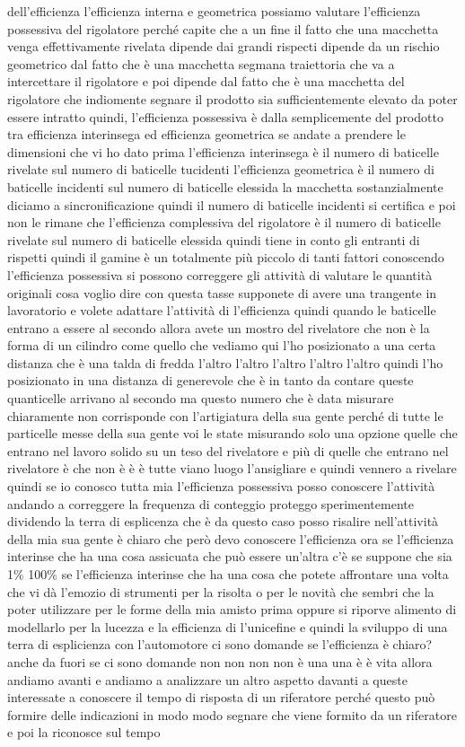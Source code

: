 dell'efficienza l'efficienza interna e geometrica possiamo valutare l'efficienza possessiva del rigolatore perché capite che a un fine il fatto che una macchetta venga effettivamente rivelata dipende dai grandi rispecti dipende da un rischio geometrico dal fatto che è una macchetta segmana traiettoria che va a intercettare il rigolatore e poi dipende dal fatto che è una macchetta del rigolatore che indiomente segnare il prodotto sia sufficientemente elevato da poter essere intratto quindi, l'efficienza possessiva è dalla semplicemente del prodotto tra efficienza interinsega ed efficienza geometrica se andate a prendere le dimensioni che vi ho dato prima l'efficienza interinsega è il numero di baticelle rivelate sul numero di baticelle tucidenti l'efficienza geometrica è il numero di baticelle incidenti sul numero di baticelle elessida la macchetta sostanzialmente diciamo a sincronificazione quindi il numero di baticelle incidenti si certifica e poi non le rimane che l'efficienza complessiva del rigolatore è il numero di baticelle rivelate sul numero di baticelle elessida quindi tiene in conto gli entranti di rispetti quindi il gamine è un totalmente più piccolo di tanti fattori conoscendo l'efficienza possessiva si possono correggere gli attività di valutare le quantità originali cosa voglio dire con questa tasse supponete di avere una trangente in lavoratorio e volete adattare l'attività di l'efficienza quindi quando le baticelle entrano a essere al secondo allora avete un mostro del rivelatore che non è la forma di un cilindro come quello che vediamo qui l'ho posizionato a una certa distanza che è una talda di fredda l'altro l'altro l'altro l'altro l'altro quindi l'ho posizionato in una distanza di generevole che è in tanto da contare queste quanticelle arrivano al secondo ma questo numero che è data misurare chiaramente non corrisponde con l'artigiatura della sua gente perché di tutte le particelle messe della sua gente voi le state misurando solo una opzione quelle che entrano nel lavoro solido su un teso del rivelatore e più di quelle che entrano nel rivelatore è che non è è è tutte viano luogo l'ansigliare e quindi vennero a rivelare quindi se io conosco tutta mia l'efficienza possessiva posso conoscere l'attività andando a correggere la frequenza di conteggio proteggo sperimentemente dividendo la terra di esplicenza che è da questo caso posso risalire nell'attività della mia sua gente è chiaro che però devo conoscere l'efficienza ora se l'efficienza interinse che ha una cosa assicuata che può essere un'altra c'è se suppone che sia 1\% 100\% se l'efficienza interinse che ha una cosa che potete affrontare una volta che vi dà l'emozio di strumenti per la risolta o per le novità che sembri che la poter utilizzare per le forme della mia amisto prima oppure si riporve alimento di modellarlo per la lucezza e la efficienza di l'unicefine e quindi la sviluppo di una terra di esplicienza con l'automotore ci sono domande se l'efficienza è chiaro? anche da fuori se ci sono domande non non non non è una una è è vita allora andiamo avanti e andiamo a analizzare un altro aspetto davanti a queste interessate a conoscere il tempo di risposta di un riferatore perché questo può formire delle indicazioni in modo modo segnare che viene formito da un riferatore e poi la riconosce sul tempo 